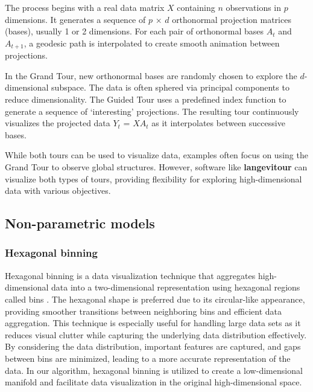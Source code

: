\documentclass[
  12pt]{article}
\begin{document}
The process begins with a real data matrix \(X\) containing \(n\)
observations in \(p\) dimensions. It generates a sequence of \(p\) ×
\(d\) orthonormal projection matrices (bases), usually 1 or 2
dimensions. For each pair of orthonormal bases \(A_t\) and \(A_{t+1}\),
a geodesic path is interpolated to create smooth animation between
projections.

In the Grand Tour, new orthonormal bases are randomly chosen to explore
the \(d\)-dimensional subspace. The data is often sphered via principal
components to reduce dimensionality. The Guided Tour uses a predefined
index function to generate a sequence of `interesting' projections. The
resulting tour continuously visualizes the projected data \(Y_t\) =
\(XA_t\) as it interpolates between successive bases.

While both tours can be used to visualize data, examples often focus on
using the Grand Tour to observe global structures. However, software
like \textbf{langevitour} can visualize both types of tours, providing
flexibility for exploring high-dimensional data with various objectives.

\hypertarget{non-parametric-models}{%
\subsection{Non-parametric models}\label{non-parametric-models}}

\hypertarget{hexagonal-binning}{%
\subsubsection{Hexagonal binning}\label{hexagonal-binning}}

Hexagonal binning is a data visualization technique that aggregates
high-dimensional data into a two-dimensional representation using
hexagonal regions called bins \citep{article66}. The hexagonal shape is
preferred due to its circular-like appearance, providing smoother
transitions between neighboring bins and efficient data aggregation.
This technique is especially useful for handling large data sets as it
reduces visual clutter while capturing the underlying data distribution
effectively. By considering the data distribution, important features
are captured, and gaps between bins are minimized, leading to a more
accurate representation of the data. In our algorithm, hexagonal binning
is utilized to create a low-dimensional manifold and facilitate data
visualization in the original high-dimensional space.
\end{document}
